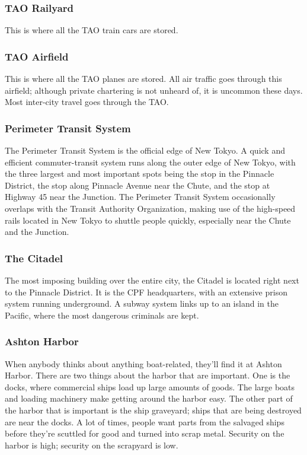 \documentclass{article}
\begin{document}
\subsubsection{TAO Railyard}
This is where all the TAO train cars are stored.
\subsubsection{TAO Airfield}
This is where all the TAO planes are stored. All air traffic goes through this
airfield; although private chartering is not unheard of, it is uncommon these days. Most inter-city travel goes through the TAO.
\subsubsection{Perimeter Transit System}
The Perimeter Transit System is the official edge of New Tokyo. A quick and
efficient commuter-transit system runs along the outer edge of New Tokyo, with the three largest and most important spots being the stop in the Pinnacle District, the stop along Pinnacle Avenue near the Chute, and the stop at Highway 45 near the Junction. The Perimeter Transit System occasionally overlaps with the Transit Authority Organization, making use of the high-speed rails located in New Tokyo to shuttle people quickly, especially near the Chute and the Junction.
\subsubsection{The Citadel}
The most imposing building over the entire city, the Citadel is located right
next to the Pinnacle District. It is the CPF headquarters, with an extensive prison system running underground. A subway system links up to an island in the Pacific, where the most dangerous criminals are kept.
\subsubsection{Ashton Harbor}
When anybody thinks about anything boat-related, they’ll find it at Ashton
Harbor. There are two things about the harbor that are important. One is the docks, where commercial ships load up large amounts of goods. The large boats and loading machinery make getting around the harbor easy. The other part of the harbor that is important is the ship graveyard; ships that are being destroyed are near the docks. A lot of times, people want parts from the salvaged ships before they’re scuttled for good and turned into scrap metal. Security on the harbor is high; security on the scrapyard is low.
\end{document}
